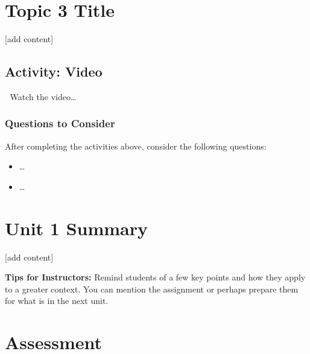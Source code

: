 \documentclass[
]{book}
\providecommand{\tightlist}{%
  \setlength{\itemsep}{0pt}\setlength{\parskip}{0pt}}
\begin{document}
\hypertarget{topic-3-title}{%
\section*{Topic 3 Title}\label{topic-3-title}}

{[}add content{]}

\hypertarget{activity-video-1}{%
\subsection*{Activity: Video}\label{activity-video-1}}

\begin{reflect}
🎦 Watch the video\ldots{}
\end{reflect}

\hypertarget{questions-to-consider-1}{%
\subsubsection*{Questions to Consider}\label{questions-to-consider-1}}

After completing the activities above, consider the following questions:

\begin{itemize}
\tightlist
\item
  \ldots{}\\
\item
  \ldots{}
\end{itemize}

\hypertarget{unit-1-summary}{%
\section*{Unit 1 Summary}\label{unit-1-summary}}

{[}add content{]}

\begin{feedback}
\textbf{Tips for Instructors:} Remind students of a few key points and
how they apply to a greater context. You can mention the assignment or
perhaps prepare them for what is in the next unit.
\end{feedback}

\hypertarget{assessment}{%
\section*{Assessment}\label{assessment}}
\end{document}
